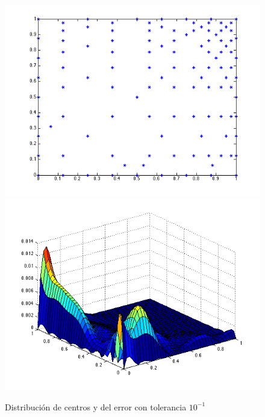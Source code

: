 \documentclass[11pt,a4paper]{article}
\begin{document}
\begin{figure}[H]
\begin{center}
\includegraphics[scale=.4]{edp3_tol1.png}
\includegraphics[scale=.4]{error_edp3_tol1.png}
\caption{Distribución de centros y del error con tolerancia $10^{-1}$}
\end{center}
\end{figure}
\end{document}
